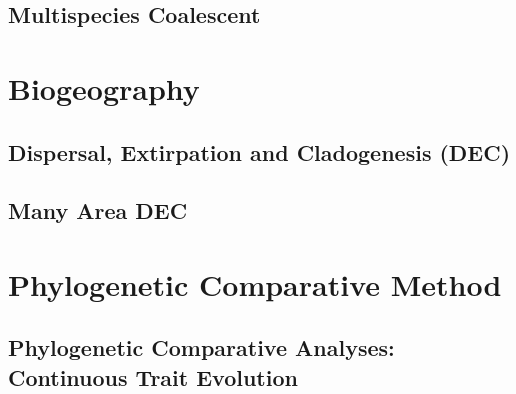 \documentclass[11pt]{book}
\begin{document}
\chapter{Multispecies Coalescent}
\def \ResourcePath {RB_MultispeciesCoalescent_Tutorial/}







\part{Biogeography}

\chapter{Dispersal, Extirpation and Cladogenesis (DEC)}
\def \ResourcePath {RB_Biogeography_DEC_Tutorial/}


\chapter{Many Area DEC}
\def \ResourcePath {RB_Biogeography_many_area_Tutorial/}








\part{Phylogenetic Comparative Method}
\chapter{Phylogenetic Comparative Analyses: Continuous Trait Evolution}
\def \ResourcePath {RB_PhyloComparative_Tutorial/}

\end{document}
